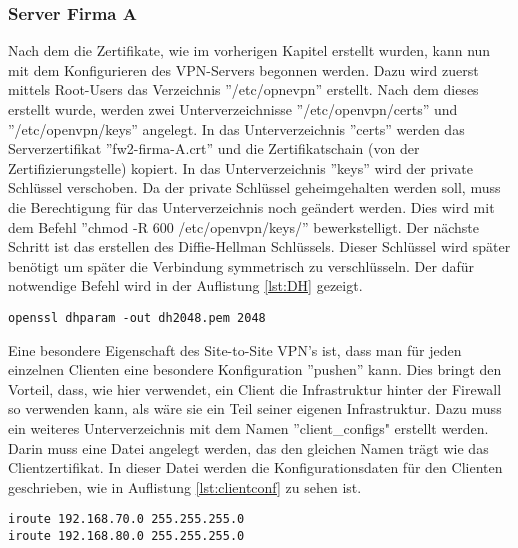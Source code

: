 \subsubsection{Server Firma A}
Nach dem die Zertifikate, wie im vorherigen Kapitel erstellt wurden, kann nun mit dem Konfigurieren des VPN-Servers begonnen werden. Dazu wird zuerst mittels Root-Users das Verzeichnis ''/etc/opnevpn'' erstellt. Nach dem dieses erstellt wurde, werden zwei Unterverzeichnisse ''/etc/openvpn/certs'' und ''/etc/openvpn/keys'' angelegt. In das Unterverzeichnis ''certs'' werden das Serverzertifikat ''fw2-firma-A.crt'' und die Zertifikatschain (von der Zertifizierungstelle) kopiert. In das Unterverzeichnis ''keys'' wird der private Schlüssel verschoben. Da der private Schlüssel geheimgehalten werden soll, muss die Berechtigung für das Unterverzeichnis noch geändert werden. Dies wird mit dem Befehl ''chmod -R 600 /etc/openvpn/keys/'' bewerkstelligt. Der nächste Schritt ist das erstellen des Diffie-Hellman Schlüssels. Dieser Schlüssel wird später benötigt um später die Verbindung symmetrisch zu verschlüsseln. Der dafür notwendige Befehl wird in der Auflistung \ref{lst:DH} gezeigt.\newline
\lstset{
	basicstyle=\footnotesize, frame=tb,
	xleftmargin=.2\textwidth, xrightmargin=.2\textwidth
}
\begin{lstlisting}[caption={Erzeugen des Diffie-Hellman Schlüssels},label=lst:DH]
openssl dhparam -out dh2048.pem 2048
\end{lstlisting}
\vspace{\baselineskip}
Eine besondere Eigenschaft des Site-to-Site VPN's ist, dass man für jeden einzelnen Clienten eine besondere Konfiguration ''pushen'' kann. Dies bringt den Vorteil, dass, wie hier verwendet, ein Client die Infrastruktur hinter der Firewall so verwenden kann, als wäre sie ein Teil seiner eigenen Infrastruktur. Dazu muss ein weiteres Unterverzeichnis mit dem Namen ''client\_configs" erstellt werden. Darin muss eine Datei angelegt werden, das den gleichen Namen trägt wie das Clientzertifikat. In dieser Datei werden die Konfigurationsdaten für den Clienten geschrieben, wie in Auflistung \ref{lst:clientconf} zu sehen ist.\newline
\lstset{
	basicstyle=\footnotesize, frame=tb,
	xleftmargin=.2\textwidth, xrightmargin=.2\textwidth
}
\begin{lstlisting}[caption={Clientkonfigurationsdatei fw-firma-b},label=lst:clientconf]
iroute 192.168.70.0 255.255.255.0
iroute 192.168.80.0 255.255.255.0
\end{lstlisting}
